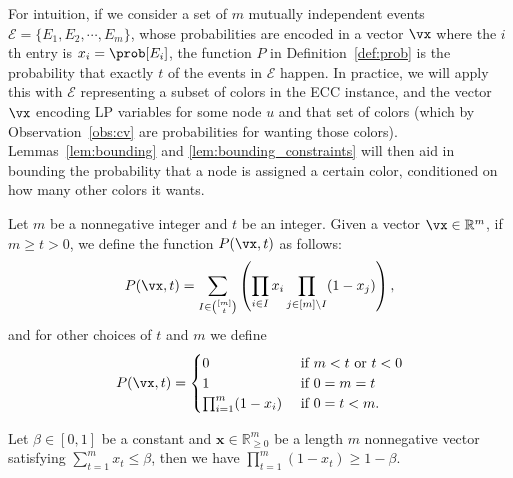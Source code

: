 For intuition, if we consider a set of $m$ mutually independent events $\mathcal{E} = \{E_1, E_2, \cdots, E_m\}$, whose probabilities are encoded in a vector $\vx$ where the $i$th entry is $x_i = \prob[E_i]$, the function $P$ in Definition~\ref{def:prob} is the probability that exactly $t$ of the events in $\mathcal{E}$ happen. In practice, we will apply this with $\mathcal{E}$ representing a subset of colors in the ECC instance, and the vector $\vx$ encoding LP variables for some node $u$ and that set of colors (which by Observation~\ref{obs:cv} are probabilities for wanting those colors). Lemmas~\ref{lem:bounding} and \ref{lem:bounding_constraints} will then aid in bounding the probability that a node is assigned a certain color, conditioned on how many other colors it wants. 

\begin{definition}
	\label{def:prob}
	Let $m$ be a nonnegative integer and $t$ be an integer. Given a vector $\vx \in \mathbb{R}^m$, if $m \geq t > 0$, we define the function $P(\vx, t)$ as follows:
	\[
	P(\vx, t) = \sum_{I \in {[m] \choose t}} \left( \prod_{i \in I} x_i \prod_{j\in [m] \setminus I} (1 - x_j) \right),
	\]
	and for other choices of $t$ and $m$ we define
	\begin{equation*}
		P(\vx, t) = \begin{cases}
			0 & \text{ if $m < t$ or $t < 0$} \\
			1 & \text{ if $0 = m = t$} \\
			\prod_{i = 1}^m (1 - x_i) & \text{ if $0 = t < m$.}
		\end{cases} 
	\end{equation*}
\end{definition}

\begin{lemma}
	\label{lem:sum_to_prod}
	Let $\beta \in [0,1]$ be a constant and $\mathbf{x} \in \mathbb{R}^m_{\geq 0}$ be a length $m$ nonnegative vector satisfying $\sum_{t=1}^m x_t \leq \beta$, then we have $\prod_{t=1}^m (1 - x_t) \geq 1 - \beta$.
\end{lemma}

